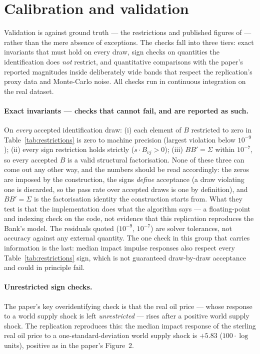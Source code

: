 \section{Calibration and validation}
\label{sec:validation}

Validation is against ground truth --- the restrictions and published figures of \citet{brignone2025} --- rather than the mere absence of exceptions. The checks fall into three tiers: exact invariants that must hold on every draw, sign checks on quantities the identification does \emph{not} restrict, and quantitative comparisons with the paper's reported magnitudes inside deliberately wide bands that respect the replication's proxy data and Monte-Carlo noise. All checks run in continuous integration on the real dataset.

\paragraph{Exact invariants --- checks that cannot fail, and are reported as such.} On \emph{every} accepted identification draw: (i) each element of $B$ restricted to zero in Table~\ref{tab:restrictions} is zero to machine precision (largest violation below $10^{-9}$); (ii) every sign restriction holds strictly ($s \cdot B_{vj} > 0$); (iii) $BB' = \Sigma$ within $10^{-7}$, so every accepted $B$ is a valid structural factorisation. None of these three can come out any other way, and the numbers should be read accordingly: the zeros are imposed by the \citet{arias2018} construction, the signs \emph{define} acceptance (a draw violating one is discarded, so the pass rate over accepted draws is one by definition), and $BB'=\Sigma$ is the factorisation identity the construction starts from. What they test is that the implementation does what the algorithm says --- a floating-point and indexing check on the code, not evidence that this replication reproduces the Bank's model. The residuals quoted ($10^{-9}$, $10^{-7}$) are solver tolerances, not accuracy against any external quantity. The one check in this group that carries information is the last: median impact impulse responses also respect every Table~\ref{tab:restrictions} sign, which is not guaranteed draw-by-draw acceptance and could in principle fail.

\paragraph{Unrestricted sign checks.} The paper's key overidentifying check is that the real oil price --- whose response to a world supply shock is left \emph{unrestricted} --- rises after a positive world supply shock. The replication reproduces this: the median impact response of the sterling real oil price to a one-standard-deviation world supply shock is $+5.83$ ($100\cdot\log$ units), positive as in the paper's Figure~2.

